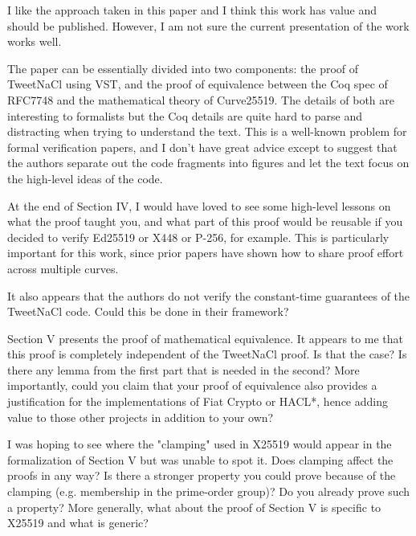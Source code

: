\begin{center}
\end{center}

I like the approach taken in this paper and I think this work has value and
should be published.
However, I am not sure the current presentation of the work works well.

The paper can be essentially divided into two components: the proof of TweetNaCl
using VST, and the proof of equivalence between the Coq spec of RFC7748 and the
mathematical theory of Curve25519.  The details of both are interesting to
formalists but the Coq details are quite hard to parse and distracting when
trying to understand the text. This is a well-known problem for formal
verification papers, and I don't have great advice except to suggest that the
authors separate out the code fragments into figures and let the text focus
on the high-level ideas of the code.

At the end of Section IV, I would have loved to see some high-level lessons on
what the proof taught you, and what part of this proof would be reusable if you
decided to verify Ed25519 or X448 or P-256, for example. This is particularly
important for this work, since prior papers have shown how to share proof effort
across multiple curves.

It also appears that the authors do not verify the constant-time guarantees of
the TweetNaCl code. Could this be done in their framework?

Section V presents the proof of mathematical equivalence. It appears to me that
this proof is completely independent of the TweetNaCl proof. Is that the case?
Is there any lemma from the first part that is needed in the second? More
importantly, could you claim that your proof of equivalence also provides a
justification for the implementations of Fiat Crypto or HACL*, hence adding
value to those other projects in addition to your own?

I was hoping to see where the "clamping" used in X25519 would appear in the
formalization of Section V but was unable to spot it. Does clamping affect the
proofs in any way? Is there a stronger property you could prove because of the
clamping (e.g. membership in the prime-order group)?
Do you already prove such a property?  More generally, what about the proof of
Section V is specific to X25519 and what is generic?
